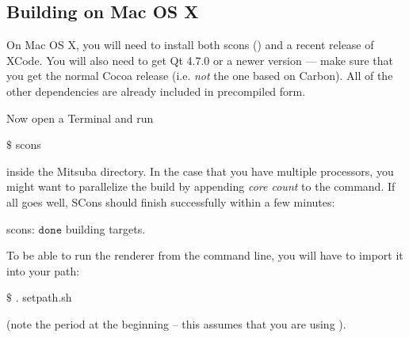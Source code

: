 \subsection{Building on Mac OS X}
On Mac OS X, you will need to install both scons () and 
a recent release of XCode. You will also need to get Qt 4.7.0 or a newer version
--- make sure that you get the normal Cocoa release (i.e. \emph{not} the one based on Carbon). All of the
other dependencies are already included in precompiled form.

Now open a Terminal and run
\begin{shell}
$\text{\$}$ scons
\end{shell}
inside the Mitsuba directory. In the case that you have multiple processors, you might want to parallelize the build by appending \emph{core count} to the command.
If all goes well, SCons should finish successfully within a few minutes:
\begin{shell}
scons: $\texttt{done}$ building targets.
\end{shell}
To be able to run the renderer from the command line, you will have to import it into your path:
\begin{shell}
$\text{\$}$ . setpath.sh
\end{shell}
(note the period at the beginning -- this assumes that you are using ).
